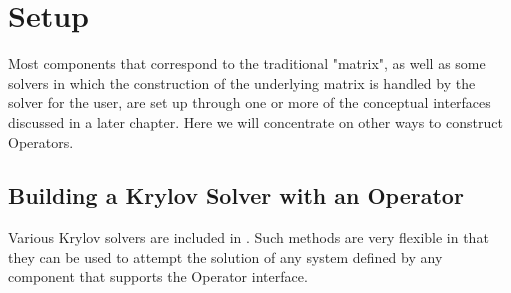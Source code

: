 \section{Setup}

Most components that correspond to the traditional "matrix", as well as
some solvers in which the 
construction of the underlying matrix is handled by the solver for the user,
are set up through one or more 
of the conceptual interfaces discussed in a later chapter. Here we will
concentrate on other ways to 
construct Operators.

\subsection{Building a Krylov Solver with an Operator}

Various Krylov solvers are included in \hypre{}.
Such methods are very flexible in that they can be used to attempt
the solution of any system defined by any component that supports the
Operator interface.